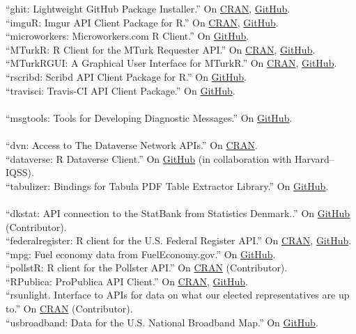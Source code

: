 \documentclass[12pt]{article}
\newcommand{\topic}[1]{\pagebreak[3]\indent {\color{lg}{\footnotesize #1 }}\\}
\newcommand{\entry}[1]{\indent {\color{lg}\guillemotright}\hspace{2pt}#1\vspace{.25em}\\}
\begin{document}
	\entry{``ghit: Lightweight GitHub Package Installer.'' On \href{https://cran.r-project.org/package=ghit}{CRAN}, \href{https://github.com/cloudyr/ghit}{GitHub}.}
	\entry{``imguR: Imgur API Client Package for R.'' On \href{https://cran.r-project.org/package=imguR}{CRAN}, \href{https://github.com/cloudyr/imguR}{GitHub}.}
	\entry{``microworkers: Microworkers.com R Client.'' On \href{https://github.com/cloudyr/microworkers}{GitHub}.}
	\entry{``MTurkR: R Client for the MTurk Requester API.'' On \href{https://cran.r-project.org/package=MTurkR}{CRAN}, \href{https://github.com/leeper/MTurkR}{GitHub}.}
	\entry{``MTurkRGUI: A Graphical User Interface for MTurkR.'' On \href{https://cran.r-project.org/package=MTurkRGUI}{CRAN}, \href{https://github.com/leeper/MTurkRGUI}{GitHub}.}
	\entry{``rscribd: Scribd API Client Package for R.'' On \href{https://github.com/cloudyr/rscribd}{GitHub}.}
	\entry{``travisci: Travis-CI API Client Package.'' On \href{https://github.com/cloudyr/travisci}{GitHub}.}

	\topic{R packages contributed to RL10N}
	\entry{``msgtools: Tools for Developing Diagnostic Messages.'' On \href{https://github.com/RL10N/msgtools}{GitHub}.}

	\topic{R packages contributed to the rOpenSci project}
	\entry{``dvn: Access to The Dataverse Network APIs.'' On \href{https://cran.r-project.org/package=dvn}{CRAN}.}
	\entry{``dataverse: R Dataverse Client.'' On \href{https://github.com/iqss/dataverse-client-r}{GitHub} (in collaboration with Harvard--IQSS).}
	\entry{``tabulizer: Bindings for Tabula PDF Table Extractor Library.'' On \href{https://github.com/ropensci/tabulizer}{GitHub}.}

	\topic{R packages contributed to the rOpenGov project}
	\entry{``dkstat: API connection to the StatBank from Statistics Denmark..'' On \href{https://github.com/rOpenGov/dkstat}{GitHub} (Contributor).}
	\entry{``federalregister: R client for the U.S. Federal Register API.'' On \href{https://cran.r-project.org/package=federalregister}{CRAN}, \href{https://github.com/rOpenGov/federalregister}{GitHub}.}
	\entry{``mpg: Fuel economy data from FuelEconomy.gov.'' On \href{https://github.com/rOpenGov/mpg}{GitHub}.}
	\entry{``pollstR: R client for the Pollster API.'' On \href{https://cran.r-project.org/package=pollstR}{CRAN} (Contributor).}
	\entry{``RPublica: ProPublica API Client.'' On \href{https://cran.r-project.org/package=RPublica}{CRAN}, \href{https://github.com/rOpenGov/RPublica}{GitHub}.}
	\entry{``rsunlight. Interface to APIs for data on what our elected representatives are up to.'' On \href{https://cran.r-project.org/package=rsunlight}{CRAN} (Contributor).}
	\entry{``usbroadband: Data for the U.S. National Broadband Map.'' On \href{https://github.com/rOpenGov/usbroadband}{GitHub}.}
\end{document}

